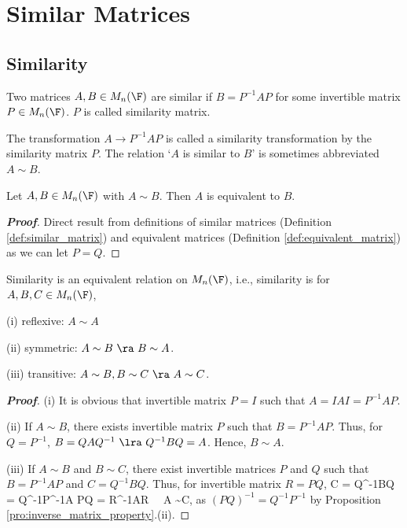 \section{Similar Matrices}

\subsection{Similarity}

\begin{definition}\label{def:similar_matrix}
Two matrices $A,B\in M_n(\F)$ are similar if $B = P^{-1}AP$ for some invertible matrix $P\in M_n(\F)$. $P$ is called similarity matrix.

The transformation $A \to P^{-1}AP$ is called a similarity transformation by the similarity matrix $P$. The relation `$A$ is similar to $B$' is sometimes abbreviated $A \sim B$.
\end{definition}

\begin{proposition}\label{pro:similarity_implies_equivalent_matrices}
Let $A,B\in M_n(\F)$ with $A\sim B$. Then $A$ is equivalent to $B$.
\end{proposition}

\begin{proof}[\bf Proof]
Direct result from definitions of similar matrices (Definition \ref{def:similar_matrix}) and equivalent matrices (Definition \ref{def:equivalent_matrix}) as we can let $P = Q$.
\end{proof}

\begin{proposition}
Similarity is an equivalent relation on $M_n(\F)$, i.e., similarity is for $A,B,C\in M_n(\F)$,
\ben
\item [(i)] reflexive: $A\sim A$
\item [(ii)] symmetric: $A\sim B \ \ra\ B\sim A$.
\item [(iii)] transitive: $A\sim B, B\sim C \ \ra\ A\sim C$.
\een
\end{proposition}

\begin{proof}[\bf Proof]%
\ben
\item [(i)] It is obvious that invertible matrix $P = I$ such that $A = IAI = P^{-1}AP$.
\item [(ii)] If $A\sim B$, there exists invertible matrix $P$ such that $B = P^{-1}AP$. Thus, for $Q = P^{-1}$, $B = QAQ^{-1} \ \lra \ Q^{-1}BQ = A$. Hence, $B\sim A$.
\item [(iii)] If $A\sim B$ and $B\sim C$, there exist invertible matrices $P$ and $Q$ such that $B = P^{-1}AP$ and $C = Q^{-1}BQ$. Thus, for invertible matrix $R = PQ$,
\be
C = Q^{-1}BQ = Q^{-1}P^{-1}A PQ = R^{-1}AR \ \ra \ A \sim C,
\ee
as $(PQ)^{-1} = Q^{-1}P^{-1}$ by Proposition \ref{pro:inverse_matrix_property}.(ii).
\een
\end{proof}


